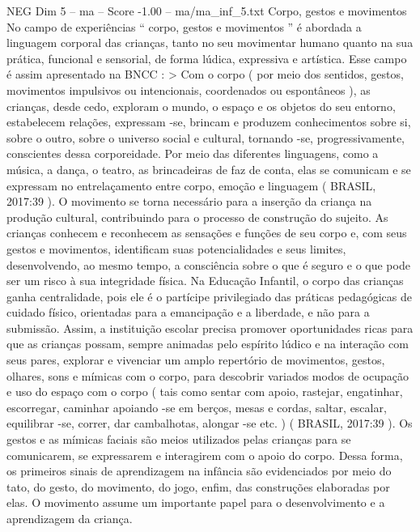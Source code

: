 \begin{textsample}{NEG Dim 5 – ma – Score -1.00 – ma/ma\_inf\_5.txt}
Corpo, gestos e movimentos No campo de experiências “ corpo, gestos e movimentos ” é abordada a linguagem corporal das crianças, tanto no seu movimentar humano quanto na sua prática, funcional e sensorial, de forma lúdica, expressiva e artística.
Esse campo é assim apresentado na BNCC : > Com o corpo ( por meio dos sentidos, gestos, movimentos impulsivos ou intencionais, coordenados ou espontâneos ), as crianças, desde cedo, exploram o mundo, o espaço e os objetos do seu entorno, estabelecem relações, expressam -se, brincam e produzem conhecimentos sobre si, sobre o outro, sobre o universo social e cultural, tornando -se, progressivamente, conscientes dessa corporeidade.
Por meio das diferentes linguagens, como a música, a dança, o teatro, as brincadeiras de faz de conta, elas se comunicam e se expressam no entrelaçamento entre corpo, emoção e linguagem ( BRASIL, 2017:39 ).
O movimento se torna necessário para a inserção da criança na produção cultural, contribuindo para o processo de construção do sujeito.
As crianças conhecem e reconhecem as sensações e funções de seu corpo e, com seus gestos e movimentos, identificam suas potencialidades e seus limites, desenvolvendo, ao mesmo tempo, a consciência sobre o que é seguro e o que pode ser um risco à sua integridade física.
Na Educação Infantil, o corpo das crianças ganha centralidade, pois ele é o partícipe privilegiado das práticas pedagógicas de cuidado físico, orientadas para a emancipação e a liberdade, e não para a submissão.
Assim, a instituição escolar precisa promover oportunidades ricas para que as crianças possam, sempre animadas pelo espírito lúdico e na interação com seus pares, explorar e vivenciar um amplo repertório de movimentos, gestos, olhares, sons e mímicas com o corpo, para descobrir variados modos de ocupação e uso do espaço com o corpo ( tais como sentar com apoio, rastejar, engatinhar, escorregar, caminhar apoiando -se em berços, mesas e cordas, saltar, escalar, equilibrar -se, correr, dar cambalhotas, alongar -se etc. ) ( BRASIL, 2017:39 ).
Os gestos e as mímicas faciais são meios utilizados pelas crianças para se comunicarem, se expressarem e interagirem com o apoio do corpo.
Dessa forma, os primeiros sinais de aprendizagem na infância são evidenciados por meio do tato, do gesto, do movimento, do jogo, enfim, das construções elaboradas por elas.
O movimento assume um importante papel para o desenvolvimento e a aprendizagem da criança.

\end{textsample}
